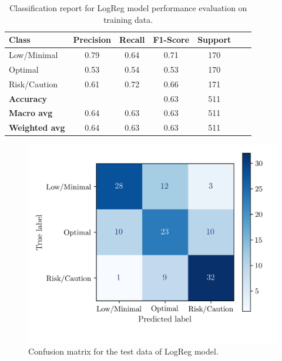 \documentclass[conference]{IEEEtran}
\begin{document}
\begin{table}[H]
\centering
\caption{Classification report for LogReg model performance evaluation on training data.}
\label{crTrainLogReg}
\begin{tabular}{lcccccc}
\toprule
\textbf{Class} & \textbf{Precision} & \textbf{Recall} & \textbf{F1-Score} & \textbf{Support} \\
\midrule
Low/Minimal & 0.79 & 0.64 & 0.71 & 170 \\
Optimal & 0.53 & 0.54 & 0.53 & 170 \\
Risk/Caution & 0.61 & 0.72 & 0.66 & 171 \\
\midrule
\textbf{Accuracy} &  &  & 0.63 & 511 \\
\textbf{Macro avg} & 0.64 & 0.63 & 0.63 & 511 \\
\textbf{Weighted avg} & 0.64 & 0.63 & 0.63 & 511 \\
\bottomrule
\end{tabular}
\end{table}

\begin{figure}[H]
    \centering
    \includegraphics[width=1\linewidth]{assets/LOGR_confmatTest.png}
    \caption{Confusion matrix for the test data of LogReg model.}
    \label{cm_Test_LogReg}
\end{figure}
\end{document}
